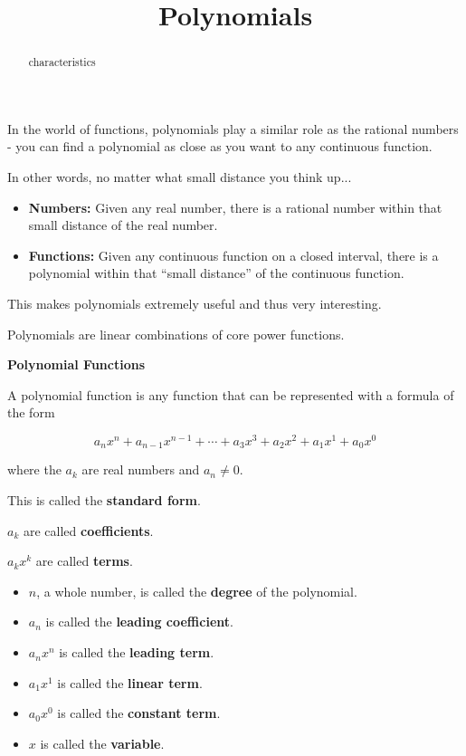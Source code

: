 \documentclass{ximera}
\title{Polynomials}
\begin{document}
\begin{abstract}
characteristics
\end{abstract}
\maketitle





In the world of functions, polynomials play a similar role as the rational numbers - you can find a polynomial as close as you want to any continuous function. 


In other words, no matter what small distance you think up...

\begin{itemize}
\item \textbf{Numbers:} Given any real number, there is a rational number within that small distance of the real number.

\item \textbf{Functions:} Given any continuous function on a closed interval, there is a polynomial within that ``small distance'' of the continuous function.
\end{itemize}

This makes polynomials extremely useful and thus very interesting. 

Polynomials are linear combinations of core power functions.


\begin{definition} \textbf{\textcolor{green!50!black}{Polynomial Functions}} 

A polynomial function is any function that can be represented with a formula of the form

\[    a_n x^n + a_{n-1} x^{n-1} + \cdots + a_3 x^3 + a_2 x^2 + a_1 x^1 + a_0 x^0      \]

where the $a_k$ are real numbers and $a_n \ne 0$.

This is called the \textbf{standard form}.

$a_k$ are called \textbf{coefficients}.

$a_k x^k$ are called \textbf{terms}.



\begin{itemize}
\item $n$, a whole number, is called the \textbf{degree} of the polynomial.
\item $a_n$ is called the \textbf{leading coefficient}.
\item $a_n x^n$ is called the \textbf{leading term}.
\item $a_1 x^1$ is called the \textbf{linear term}.
\item $a_0 x^0$ is called the \textbf{constant term}.
\item $x$ is called the \textbf{variable}.
\end{itemize}


\end{definition}
\end{document}
